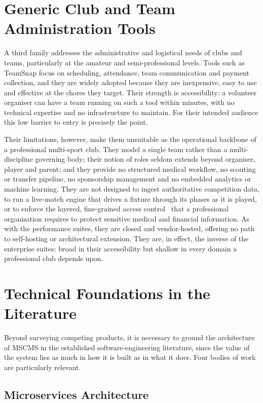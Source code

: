 \section{Generic Club and Team Administration Tools}
\label{sec:lit-admin}

A third family addresses the administrative and logistical needs of clubs and teams,
particularly at the amateur and semi-professional levels. Tools such as TeamSnap focus on
scheduling, attendance, team communication and payment collection, and they are widely
adopted because they are inexpensive, easy to use and effective at the chores they target.
Their strength is accessibility: a volunteer organiser can have a team running on such a tool
within minutes, with no technical expertise and no infrastructure to maintain. For their
intended audience this low barrier to entry is precisely the point.

Their limitations, however, make them unsuitable as the operational backbone of a
professional multi-sport club. They model a single team rather than a multi-discipline
governing body; their notion of roles seldom extends beyond organiser, player and parent;
and they provide no structured medical workflow, no scouting or transfer pipeline, no
sponsorship management and no embedded analytics or machine learning. They are not
designed to ingest authoritative competition data, to run a live-match engine that drives a
fixture through its phases as it is played, or to enforce the layered, fine-grained access
control~\cite{rbac} that a professional organisation requires to protect sensitive medical and
financial information. As with the performance suites, they are closed and vendor-hosted,
offering no path to self-hosting or architectural extension. They are, in effect, the inverse of
the enterprise suites: broad in their accessibility but shallow in every domain a professional
club depends upon.

\section{Technical Foundations in the Literature}
\label{sec:lit-technical}

Beyond surveying competing products, it is necessary to ground the architecture of MSCMS
in the established software-engineering literature, since the value of the system lies as much
in how it is built as in what it does. Four bodies of work are particularly relevant.

\subsection{Microservices Architecture}
\label{subsec:lit-micro}

